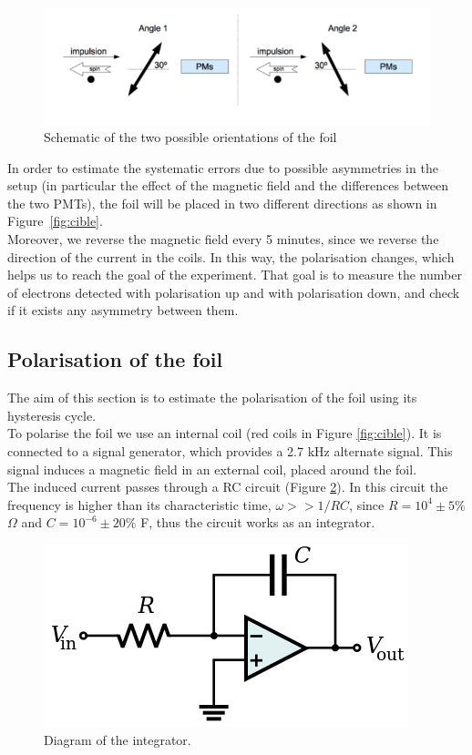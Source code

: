 \documentclass[10pt,swedish, openany]{book}
\begin{document}
\begin{figure}[H]
\includegraphics[scale=0.5]{Foil30.png}
\centering
\caption{Schematic of the two possible orientations of the foil}
\label{fig:30}
\end{figure}

In order to estimate the systematic errors due to possible asymmetries in the setup (in particular the effect of the magnetic field and the differences between the two PMTs), the foil will be placed in two different directions as shown in Figure~\ref{fig:cible}. \\

Moreover, we reverse the magnetic field every 5 minutes, since we reverse the direction of the current in the coils. In this way, the polarisation changes, which helps us to reach the goal of the experiment. That goal is to measure the number of electrons detected with polarisation up and with polarisation down, and check if it exists any asymmetry between them.

\subsection{Polarisation of the foil}\label{polfoil}

The aim of this section is to estimate the polarisation of the foil using its hysteresis cycle.\\

To polarise the foil we use an internal coil (red coils in Figure \ref{fig:cible}). It is connected to a signal generator, which provides a 2.7 kHz alternate signal. This signal induces a magnetic field in an external coil, placed around the foil.\\

The induced current passes through a RC circuit (Figure \ref{fig:int}). In this circuit the frequency is higher than its characteristic time, $\omega >>1/RC$, since $R = 10^4 \pm 5\%$ $\Omega$ and $  C = 10^{-6} \pm 20\%$ F, thus the circuit works as an integrator. 

\begin{figure}[H]
\includegraphics[scale=0.3]{integrator.png}
\centering
\caption{Diagram of the integrator.}
\label{fig:int}
\end{figure}
\end{document}
